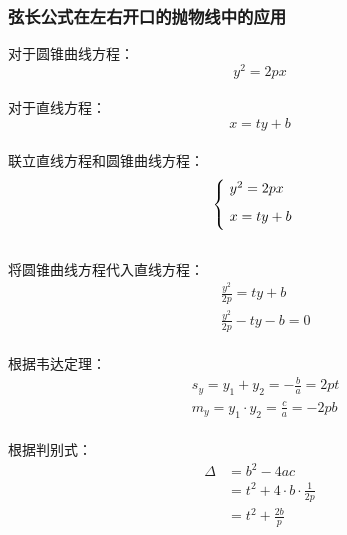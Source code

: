 \documentclass[UTF8]{ctexart}
\begin{document}
\subsubsection{弦长公式在左右开口的抛物线中的应用}
    对于圆锥曲线方程：
    \setcounter{equation}{0}
    \begin{equation}
        y^2=2px
    \end{equation}\\
    对于直线方程：
    \begin{equation}
        x=ty+b
    \end{equation}\\
    联立直线方程和圆锥曲线方程：
    \begin{equation}
        \begin{cases}
            \ y^2=2px\\[2mm]
            \ x=ty+b\vspace{3pt}
        \end{cases}
    \end{equation}\\[3mm]
    将圆锥曲线方程代入直线方程：\vspace{5pt}
    \begin{align}
        &\frac{y^2}{2p}=ty+b\\[3mm]
        &\frac{y^2}{2p}-ty-b=0
    \end{align}\\[1mm]
    根据韦达定理：
    \begin{align}
        &s_y=y_1+y_2=-\frac{b}{a}=2pt\\[3mm]
        &m_y=y_1\cdot y_2=\frac{c}{a}=-2pb
    \end{align}\\[1mm]
    根据判别式：
    \begin{align}
        \Delta&=b^2-4ac\\[4mm]
        &=t^2+4\cdot b\cdot\frac{1}{2p}\\[4mm]
        &=t^2+\frac{2b}{p}
    \end{align}

\newpage
\end{document}
